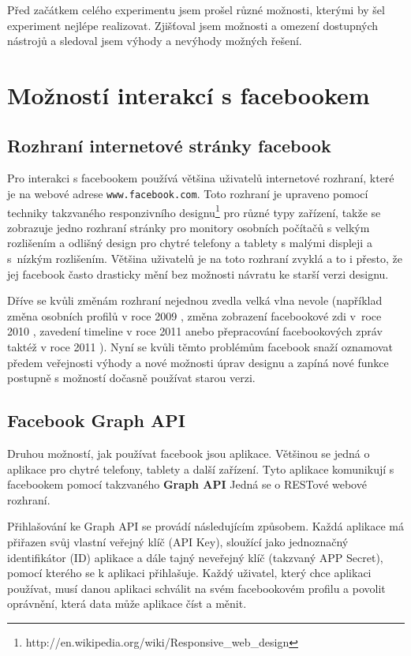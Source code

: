 \documentclass[thesis=M,czech]{FITthesis}[2013/05/10]
\begin{document}
Před začátkem celého experimentu jsem prošel různé možnosti, kterými by šel experiment nejlépe realizovat. Zjišťoval jsem možnosti a omezení dostupných nástrojů a sledoval jsem výhody a nevýhody možných řešení. 

\section{Možností interakcí s facebookem}

\subsection{Rozhraní internetové stránky facebook}
Pro interakci s facebookem používá většina uživatelů internetové rozhraní, které je na webové adrese \verb|www.facebook.com|. Toto rozhraní je upraveno pomocí techniky takzvaného responzivního designu\footnote{http://en.wikipedia.org/wiki/Responsive\_web\_design} pro různé typy zařízení, takže se zobrazuje jedno rozhraní stránky pro monitory osobních počítačů s velkým rozlišením a odlišný design pro chytré telefony a tablety s malými displeji a s~nízkým rozlišením. Většina uživatelů je na toto rozhraní zvyklá a to i přesto, že jej facebook často drasticky mění bez možnosti návratu ke starší verzi designu. 

Dříve se kvůli změnám rozhraní nejednou zvedla velká vlna nevole (například změna osobních profilů v roce 2009 \cite{web:fbNewHomePage}, změna zobrazení facebookové zdi v~roce  2010 \cite{web:fbNewNavigation}, zavedení timeline v roce 2011 \cite{web:fbNewTimeline} anebo přepracování facebookových zpráv taktéž v roce 2011 \cite{web:fbNewMessages}). Nyní se kvůli těmto problémům facebook snaží oznamovat předem veřejnosti výhody a nové možnosti úprav designu a zapíná nové funkce postupně s možností dočasně používat starou verzi.  

\subsection{Facebook Graph API}
Druhou možností, jak používat facebook jsou aplikace. Většinou se jedná o aplikace pro chytré telefony, tablety a další zařízení. Tyto aplikace komunikují s facebookem pomocí takzvaného \textbf{Graph API} \cite{web:fbGraphApi} Jedná se o RESTové webové rozhraní.

Přihlašování ke Graph API se provádí následujícím způsobem. Každá aplikace má přiřazen svůj vlastní veřejný klíč (API Key), sloužící jako jednoznačný identifikátor (ID) aplikace a dále tajný neveřejný klíč (takzvaný APP Secret), pomocí kterého se k aplikaci přihlašuje. Každý uživatel, který chce aplikaci používat, musí danou aplikaci schválit na svém facebookovém profilu a povolit oprávnění, která data může aplikace číst a měnit.
\end{document}
